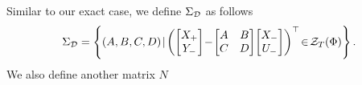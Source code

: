 Similar to our exact case, we define $\Sigma_{\mathcal{D}}$ as follows
\begin{equation} \label{ch5:def:SigmaD}
\Sigma_{\calD} = \left \lbrace (A,B,C,D) \! \mid \! \left(\begin{bmatrix} X_+\\Y_-  \end{bmatrix} \!-\! \begin{bmatrix} A&B\\
C&D\end{bmatrix}\!\begin{bmatrix}X_-\\ U_-  \end{bmatrix}\right)^\top \!\in\!\calZ_T(\Phi)  \right \rbrace.
\end{equation}
We also define another matrix $N$
